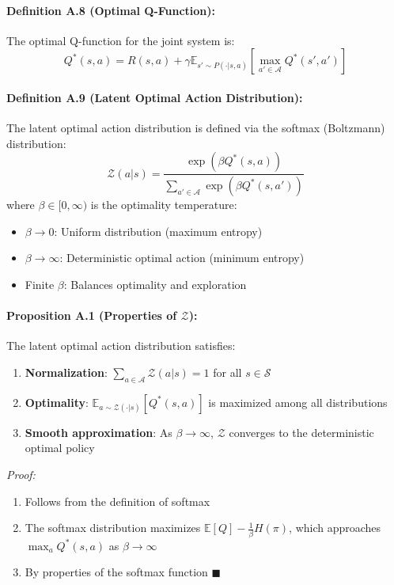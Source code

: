 \documentclass[10pt, letterpaper]{article}
\begin{document}
\paragraph{Definition A.8 (Optimal Q-Function):} The optimal Q-function for the joint system is:
\[Q^*(s, a) = R(s, a) + \gamma \mathbb{E}_{s' \sim P(\cdot|s,a)} \left[ \max_{a' \in \mathcal{A}} Q^*(s', a') \right]\]

\paragraph{Definition A.9 (Latent Optimal Action Distribution):} The latent optimal action distribution is defined via the softmax (Boltzmann) distribution:
\[\mathcal{Z}(a|s) = \frac{\exp(\beta Q^*(s,a))}{\sum_{a' \in \mathcal{A}} \exp(\beta Q^*(s,a'))}\]
where $\beta \in [0, \infty)$ is the optimality temperature:
\begin{itemize}
    \item $\beta \to 0$: Uniform distribution (maximum entropy)
    \item $\beta \to \infty$: Deterministic optimal action (minimum entropy)
    \item Finite $\beta$: Balances optimality and exploration
\end{itemize}

\paragraph{Proposition A.1 (Properties of $\mathcal{Z}$):} The latent optimal action distribution satisfies:
\begin{enumerate}
    \item \textbf{Normalization}: $\sum_{a \in \mathcal{A}} \mathcal{Z}(a|s) = 1$ for all $s \in \mathcal{S}$
    \item \textbf{Optimality}: $\mathbb{E}_{a \sim \mathcal{Z}(\cdot|s)}[Q^*(s,a)]$ is maximized among all distributions
    \item \textbf{Smooth approximation}: As $\beta \to \infty$, $\mathcal{Z}$ converges to the deterministic optimal policy
\end{enumerate}
\emph{Proof:}
\begin{enumerate}
    \item Follows from the definition of softmax
    \item The softmax distribution maximizes $\mathbb{E}[Q] - \frac{1}{\beta}H(\pi)$, which approaches $\max_a Q^*(s,a)$ as $\beta \to \infty$
    \item By properties of the softmax function $\blacksquare$
\end{enumerate}
\end{document}
